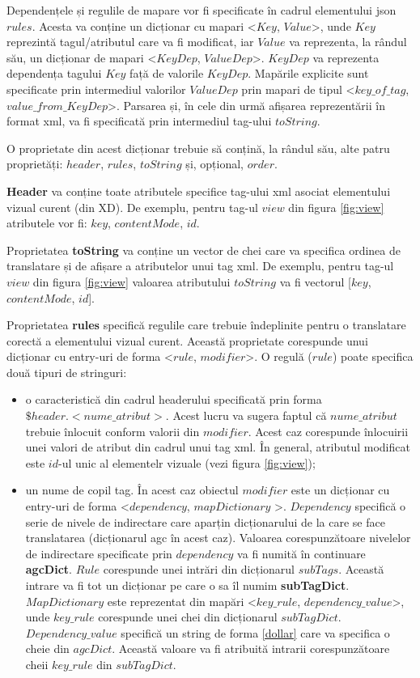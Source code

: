 Dependențele și regulile de mapare vor fi specificate în cadrul elementului json $rules$. Acesta va conține un dicționar cu mapari <$Key$, $Value$>, unde $Key$ reprezintă tagul/atributul care va fi modificat, iar $Value$ va reprezenta, la rândul său, un dicționar de mapari <$KeyDep$, $ValueDep$>.  $KeyDep$ va reprezenta dependența tagului $Key$ față de valorile $KeyDep$. Mapările explicite sunt specificate prin intermediul valorilor $ValueDep$ prin mapari de tipul <$key\_of\_tag$, $value\_from\_KeyDep$>. 
Parsarea și, în cele din urmă afișarea reprezentării în format xml, va fi specificată prin intermediul tag-ului $toString$. 

O proprietate din acest dicționar trebuie să conțină, la rândul său, alte patru proprietăți: $header$, $rules$, $toString$ și, opțional, $order$. 

\textbf{Header} va conține toate atributele specifice tag-ului xml asociat elementului vizual curent (din XD). De exemplu, pentru tag-ul $view$ din figura \ref{fig:view} atributele vor fi: $key$, $contentMode$, $id$. 

Proprietatea \textbf{toString} va conține un vector de chei care va specifica ordinea de translatare și de afișare a atributelor unui tag xml. De exemplu, pentru tag-ul $view$ din figura \ref{fig:view}  valoarea atributului $toString$ va fi vectorul [$key$, $contentMode$, $id$].

Proprietatea \textbf{rules} specifică regulile care trebuie îndeplinite pentru o translatare corectă a elementului vizual curent. Această proprietate corespunde unui dicționar cu entry-uri de forma <$rule$, $modifier$>.
O regulă ($rule$) poate specifica două tipuri de stringuri:

\begin{itemize}  
\item o caracteristică din cadrul headerului specificată prin forma $\$header.<nume\_atribut>$. Acest lucru va sugera faptul că $nume\_atribut$ trebuie înlocuit conform valorii  din $modifier$. Acest caz corespunde înlocuirii unei valori de atribut din cadrul unui tag xml. În general, atributul modificat este $id$-ul unic al elementelr vizuale (vezi figura \ref{fig:view});
\item un nume de copil tag. În acest caz obiectul $modifier$ este un dicționar cu entry-uri de forma <$dependency$, $mapDictionary$ >. $Dependency$ specifică o serie de nivele de indirectare care aparțin dicționarului de la care se face translatarea (dicționarul agc în acest caz). Valoarea corespunzătoare nivelelor de indirectare specificate prin $dependency$ va fi numită în continuare \textbf{agcDict}. $Rule$ corespunde unei intrări din dicționarul $subTags$. Această intrare va fi tot un dicționar pe care o sa îl numim \textbf{subTagDict}. $MapDictionary$ este reprezentat din mapări <$key\_rule$, $dependency\_value$>, unde $key\_rule$ corespunde unei chei din dicționarul $subTagDict$. $Dependency\_value$ specifică un string de forma \ref{dollar} care va specifica o cheie din $agcDict$. Această valoare va fi atribuită intrarii corespunzătoare cheii $key\_rule$ din $subTagDict$. 
\end{itemize}
 
